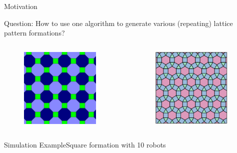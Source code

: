 \begin{frame}{Motivation}{}
  \begin{block}{Question: How to use one algorithm to generate
      various (repeating) lattice pattern formations?}
    \begin{columns}
    \begin{column}{.45\textwidth}
      \begin{figure}
        \centering
        \includegraphics[height=1.5in]{figs/tessellation2.png}
      \end{figure}
    \end{column}
    \begin{column}{.45\textwidth}
       \begin{figure}
         \centering
        \includegraphics[height=1.5in]{figs/tessellation1.png}
      \end{figure}
    \end{column}
  \end{columns} 
  \end{block}
\end{frame}
\begin{frame}{Simulation Example}{Square formation with 10 robots}
  \begin{center}
  \end{center}
\end{frame}
